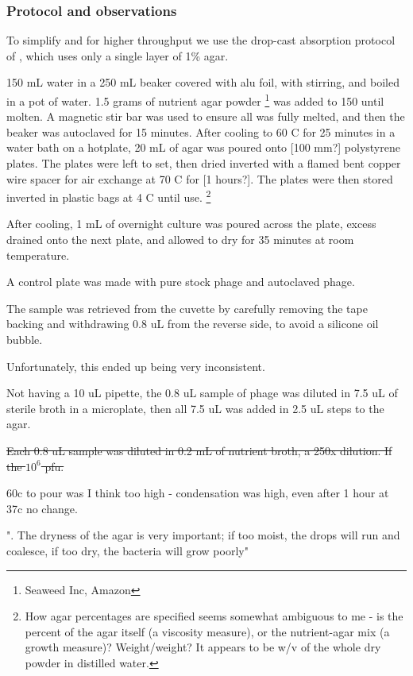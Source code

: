 \documentclass[paper.tex]{subfiles}
\begin{document}
\subsubsection{Protocol and observations}

\begin{toolchain}

To simplify and for higher throughput we use the drop-cast absorption protocol of \cite{Simple2018}, which uses only a single layer of 1\% agar.

150 mL water in a 250 mL beaker covered with alu foil, with stirring, and boiled in a pot of water. 1.5 grams of nutrient agar powder \footnote{Seaweed Inc, Amazon} was added to 150  until molten. A magnetic stir bar was used to ensure all was fully melted,
and then the beaker was autoclaved for 15 minutes. After cooling to 60 C for 25 minutes in a water bath on a hotplate, 20 mL of agar was poured onto [100 mm?] polystyrene plates. The plates were left to set, then dried inverted with a flamed bent copper wire spacer for air exchange at 70 C for [1 hours?].
The plates were then stored inverted in plastic bags at 4 C until use.
\footnote{How agar percentages are specified seems somewhat ambiguous to me - is the percent of the agar itself (a viscosity measure), or the nutrient-agar mix (a growth measure)?
	Weight/weight? It appears to be w/v of the whole dry powder in distilled water.}

After cooling, 1 mL of overnight culture was poured across the plate, excess drained onto the next plate, and allowed to dry for 35 minutes at room temperature.

A control plate was made with pure stock phage and autoclaved phage.

The sample was retrieved from the cuvette by carefully removing the tape backing and withdrawing 0.8 uL from the reverse side, to avoid a silicone oil bubble.

Unfortunately, this ended up being very inconsistent.

Not having a 10 uL pipette, the 0.8 uL sample of phage was diluted in 7.5 uL of sterile broth in a microplate, then all 7.5 uL was added in 2.5 uL steps to the agar.

\st{Each 0.8 uL sample was diluted in 0.2 mL of nutrient broth, a 250x dilution. If the $10^6$ pfu.}

60c to pour was I think too high - condensation was high, even after 1 hour at 37c no change.

". The dryness of the agar is very important; if too moist, the
drops will run and coalesce, if too dry, the bacteria will grow
poorly"


\end{toolchain}
\end{document}
